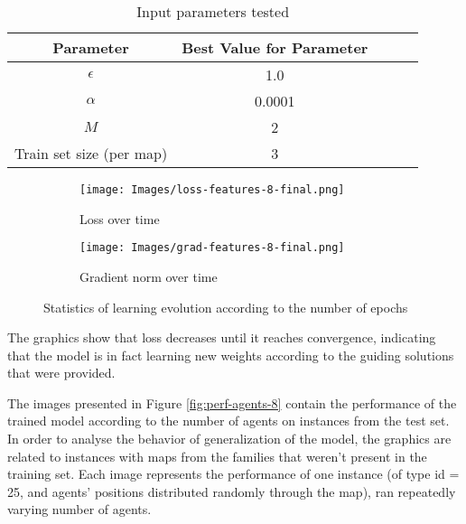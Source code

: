 \begin{table}[!ht]
    \centering
    \caption{Input parameters tested}
    \begin{tabular}{|c|c|c|c|c|}
        \hline
        Parameter & Best Value for Parameter \\
        \hline
        $\epsilon$ & 1.0 \\
        \hline
        $\alpha$ & 0.0001 \\
        \hline
        $M$ & 2 \\
        \hline
        Train set size (per map) & 3 \\
        \hline
    \end{tabular}
    \label{tab:params-features-best}
\end{table}

\begin{figure}[!ht]
    \centering
    \begin{subfigure}[b]{0.45\textwidth}
        \texttt{[image: Images/loss-features-8-final.png]}
        \caption{Loss over time}
        \label{fig:loss-features-8}
    \end{subfigure}
    \hspace{0.01\textwidth}
    \begin{subfigure}[b]{0.45\textwidth}
        \texttt{[image: Images/grad-features-8-final.png]}
        \caption{Gradient norm over time}
        \label{fig:grad-features-8}
    \end{subfigure}
    
    \caption{Statistics of learning evolution according to the number of epochs}
    \label{fig:loss-graph-features}
\end{figure}

The graphics show that loss decreases until it reaches convergence, indicating that the model is in fact learning new weights according to the guiding solutions that were provided.

The images presented in Figure \ref{fig:perf-agents-8} contain the performance of the trained model according to the number of agents on instances from the test set. In order to analyse the behavior of generalization of the model, the graphics are related to instances with maps from the families that weren't present in the training set. Each image represents the performance of one instance (of type id = 25, and agents' positions distributed randomly through the map), ran repeatedly varying number of agents.

